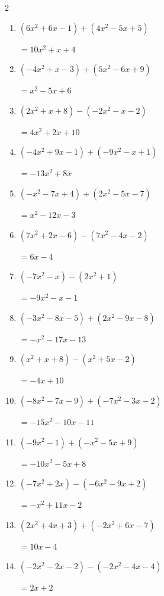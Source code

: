 \begin{multicols}{2}
\begin{enumerate}
  \item $(6x^{2}+6x-1)+(4x^{2}-5x+5)$

        $=10x^{2}+x+4$

  \item $(-4x^{2}+x-3)+(5x^{2}-6x+9)$

        $=x^{2}-5x+6$

  \item $(2x^{2}+x+8)-(-2x^{2}-x-2)$

        $=4x^{2}+2x+10$

  \item $(-4x^{2}+9x-1)+(-9x^{2}-x+1)$

        $=-13x^{2}+8x$

\columnbreak %

\resetques

  \item $(-x^{2}-7x+4)+(2x^{2}-5x-7)$

        $=x^{2}-12x-3$

  \item $(7x^{2}+2x-6)-(7x^{2}-4x-2)$

        $=6x-4$

  \item $(-7x^{2}-x)-(2x^{2}+1)$

        $=-9x^{2}-x-1$

  \item $(-3x^{2}-8x-5)+(2x^{2}-9x-8)$

        $=-x^{2}-17x-13$

  \item $(x^{2}+x+8)-(x^{2}+5x-2)$

        $=-4x+10$

  \item $(-8x^{2}-7x-9)+(-7x^{2}-3x-2)$

        $=-15x^{2}-10x-11$

  \item $(-9x^{2}-1)+(-x^{2}-5x+9)$

        $=-10x^{2}-5x+8$

  \item $(-7x^{2}+2x)-(-6x^{2}-9x+2)$

        $=-x^{2}+11x-2$

  \item $(2x^{2}+4x+3)+(-2x^{2}+6x-7)$

        $=10x-4$

  \item $(-2x^{2}-2x-2)-(-2x^{2}-4x-4)$

        $=2x+2$


\end{enumerate}
\end{multicols}
